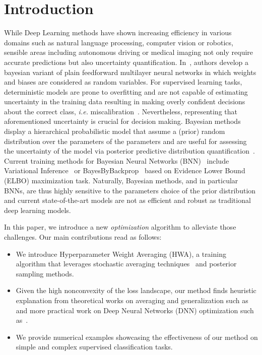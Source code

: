 \documentclass[tablecaption=bottom,wcp]{jmlr} %
\begin{document}
\section{Introduction}
While Deep Learning methods have shown increasing efficiency in various domains such as natural language processing, computer vision or robotics, sensible areas including autonomous driving or medical imaging not only require accurate predictions but also uncertainty quantification.
In~\citep{neal2012bayesian}, authors develop a bayesian variant of plain feedforward multilayer neural networks in which weights and biases are considered as random variables.
For supervised learning tasks, deterministic models are prone to overfitting and are not capable of estimating uncertainty in the training data resulting in making overly confident decisions about the correct class, \textit{i.e.} miscalibration~\citep{guo2017calibration,kendall2017uncertainties}.
Nevertheless, representing that aforementioned uncertainty is crucial for decision making.
Bayesian methods display a hierarchical probabilistic model that assume a (prior) random distribution over the parameters of the parameters and are useful for assessing the uncertainty of the model via posterior predictive distribution quantification~\citep{blundell2015weight,kingma2015variational}.
Current training methods for Bayesian Neural Networks (BNN)~\citep{neal2012bayesian} include Variational Inference~\citep{graves2011practical, hoffman2013stochastic} or BayesByBackprop~\citep{blundell2015weight} based on Evidence Lower Bound (ELBO) maximization task.
Naturally, Bayesian methods, and in particular BNNs, are thus highly sensitive to the parameters choice of the prior distribution and current state-of-the-art models are not as efficient and robust as traditional deep learning models.

In this paper, we introduce a new \emph{optimization} algorithm to alleviate those challenges.
Our main contributions read as follows:
\begin{itemize}
\item We introduce Hyperparameter Weight Averaging (HWA), a training algorithm that leverages stochastic averaging techniques~\citep{polyak1992acceleration} and posterior sampling methods.
\item Given the high nonconvexity of the loss landscape, our method finds heuristic explanation from theoretical works on averaging and generalization such as~\citep{keskar2016large,he2019asymmetric} and more practical work on Deep Neural Networks (DNN) optimization such as~\citep{izmailov2018averaging}.

\item We provide numerical examples showcasing the effectiveness of our method on simple and complex supervised classification tasks.
\end{itemize}
\end{document}
